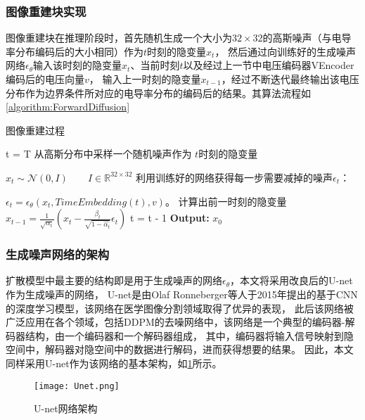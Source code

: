 \subsubsection{图像重建块实现}

图像重建块在推理阶段时，首先随机生成一个大小为$32\times 32$的高斯噪声（与电导率分布编码后的大小相同）作为$t$时刻的隐变量$x_t$，
然后通过向训练好的生成噪声网络$\epsilon_\theta$输入该时刻的隐变量$x_t$、当前时刻$t$以及经过上一节中电压编码器VEncoder编码后的电压向量$v$，
输入上一时刻的隐变量$x_{t-1}$，经过不断迭代最终输出该电压分布作为边界条件所对应的电导率分布的编码后的结果。其算法流程如\cref{algorithm:ForwardDiffusion}

\begin{algorithm}[H]
    
    \caption{图像重建过程}
    \begin{algorithmic}[1]
        \State t = T
        \State 从高斯分布中采样一个随机噪声作为 $t$时刻的隐变量
        
        $x_t \sim \mathcal{N}(0, I) \qquad I \in \mathbb{R}^{32 \times 32}$
        \State 利用训练好的网络获得每一步需要减掉的噪声$\epsilon_t$：
        
        $\epsilon_t = \epsilon_\theta(x_t, TimeEmbedding(t), v)$。
        \State 计算出前一时刻的隐变量$x_{t-1} = \frac{1}{\sqrt{\alpha_t}}(x_t - \frac{\beta_t}{\sqrt{1-\hat{\alpha_t}}}\epsilon_t)$
        \State t = t - 1
        \EndWhile
        \State \textbf{Output:} $x_0$
    \end{algorithmic}
    \label{algorithm:ForwardDiffusion}
\end{algorithm}

\subsubsection{生成噪声网络的架构}

扩散模型中最主要的结构即是用于生成噪声的网络$\epsilon_\theta$，本文将采用改良后的U-net作为生成噪声的网络，
U-net是由Olaf Ronneberger等人于2015年提出的基于CNN的深度学习模型\cite{2015U}，该网络在医学图像分割领域取得了优异的表现，
此后该网络被广泛应用在各个领域，包括DDPM的去噪网络中\cite{DDPM}，该网络是一个典型的编码器-解码器结构，由一个编码器和一个解码器组成，
其中，编码器将输入信号映射到隐空间中，解码器对隐空间中的数据进行解码，进而获得想要的结果。
因此，本文同样采用U-net作为该网络的基本架构，如\cref{figure:Unet}所示。

\begin{figure}
    \centering
    \texttt{[image: Unet.png]}
    \caption{U-net网络架构}
    \label{figure:Unet}
\end{figure}

